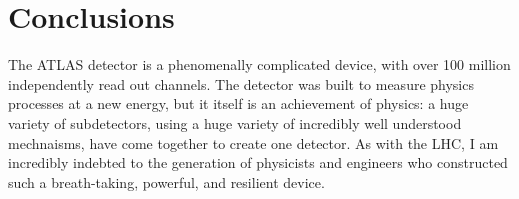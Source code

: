 
\section{Conclusions} 

The ATLAS detector is a phenomenally complicated device, with over 100 million independently read out channels. The detector was built to measure physics processes at a new energy, but it itself is an achievement of physics: a huge variety of subdetectors, using a huge variety of incredibly well understood mechnaisms, have come together to create one detector. As with the LHC, I am incredibly indebted to the generation of physicists and engineers who constructed such a breath-taking, powerful, and resilient device.
